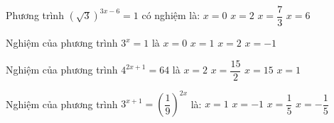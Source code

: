 \begin{ex}%
	Phương trình  $\left(\sqrt{3}\right)^{3x-6}=1$ có nghiệm là:
	 \choice
		 {$x=0$}
		{\True $x=2$} 
		{$x=\dfrac{7}{3}$} 
		 {$x=6$}
\end{ex}

\begin{ex}%
	 Nghiệm của phương trình $3^x=1$ là
	 \choice
		 {\True $x=0$}
		{$x=1$} 
		 {$x=2$}
		{$x=-1$} 
\end{ex}

\begin{ex}%
	Nghiệm  của phương trình $4^{2x+1}=64$ là
	 \choice
		{$x=2$} 
		{$x=\dfrac{15}{2}$} 
		{$x=15$} 
		 {\True $x=1$}
\end{ex}

\begin{ex}%
	Nghiệm của phương trình  $3^{x+1}=\left(\dfrac{1}{9}\right)^{2x}$ là:
	 \choice
		 {$x=1$}
		 {$x=-1$}
		 {$x=\dfrac{1}{5}$}
		 {\True $x=-\dfrac{1}{5}$}
\end{ex}

